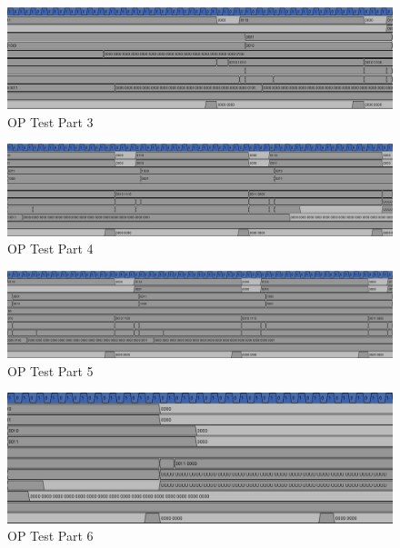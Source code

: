 \begin{figure}[!ht]
    \centering
    \includegraphics[width=\textwidth]{Images/OP Test Part 3.png}
    \caption{OP Test Part 3}
\end{figure}

\begin{figure}[!ht]
    \centering
    \includegraphics[width=\textwidth]{Images/OP Test Part 4.png}
    \caption{OP Test Part 4}
\end{figure}

\begin{figure}[!ht]
    \centering
    \includegraphics[width=\textwidth]{Images/OP Test Part 5.png}
    \caption{OP Test Part 5}
\end{figure}

\begin{figure}[!ht]
    \centering
    \includegraphics[width=\textwidth]{Images/OP Test Part 6.png}
    \caption{OP Test Part 6}
\end{figure}

\clearpage
